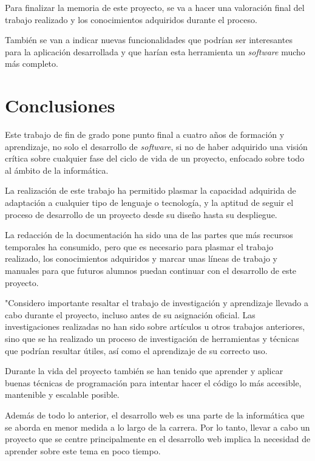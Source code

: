 
Para finalizar la memoria de este proyecto, se va a hacer una valoración final del trabajo realizado y los conocimientos adquiridos durante el proceso.

También se van a indicar nuevas funcionalidades que podrían ser interesantes para la aplicación desarrollada y que harían esta herramienta un \textit{software} mucho más completo.

\section{Conclusiones}
Este trabajo de fin de grado pone punto final a cuatro años de formación y aprendizaje, no solo el desarrollo de \textit{software}, si no de haber adquirido una visión crítica sobre cualquier fase del ciclo de vida de un proyecto, enfocado sobre todo al ámbito de la informática.

La realización de este trabajo ha permitido plasmar la capacidad adquirida de adaptación a cualquier tipo de lenguaje o tecnología, y la aptitud de seguir el proceso de desarrollo de un proyecto desde su diseño hasta su despliegue.

La redacción de la documentación ha sido una de las partes que más recursos temporales ha consumido, pero que es necesario para plasmar el trabajo realizado, los conocimientos adquiridos y marcar unas líneas de trabajo y manuales para que futuros alumnos puedan continuar con el desarrollo de este proyecto.

"Considero importante resaltar el trabajo de investigación y aprendizaje llevado a cabo durante el proyecto, incluso antes de su asignación oficial.
Las investigaciones realizadas no han sido sobre artículos u otros trabajos anteriores, sino que se ha realizado un proceso de investigación de herramientas y técnicas que podrían resultar útiles, así como el aprendizaje de su correcto uso.

Durante la vida del proyecto también se han tenido que aprender y aplicar buenas técnicas de programación para intentar hacer el código lo más accesible, mantenible y escalable posible.

Además de todo lo anterior, el desarrollo web es una parte de la informática que se aborda en menor medida a lo largo de la carrera. Por lo tanto, llevar a cabo un proyecto que se centre principalmente en el desarrollo web implica la necesidad de aprender sobre este tema en poco tiempo.


